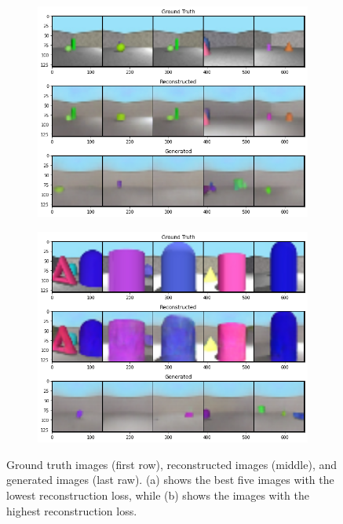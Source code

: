 \documentclass[11pt,a4paper]{article}
\begin{document}
\begin{figure}[t]
    \centering
    \begin{subfigure}[]{0.49\textwidth}
        \centering
        \includegraphics[width=\textwidth]{output1.png}
        \caption{}
        \label{fig:output1}
     \end{subfigure}
     \begin{subfigure}[]{0.49\textwidth}
        \centering
        \includegraphics[width=\textwidth]{output2.png}
        \caption{}
        \label{fig:output2}
     \end{subfigure}
    \caption{Ground truth images (first row), reconstructed images (middle), and generated images (last raw). (a) shows the best five images with the lowest reconstruction loss, while (b) shows the images with the highest reconstruction loss.}
    \label{fig:outputs}
\end{figure}
\end{document}
